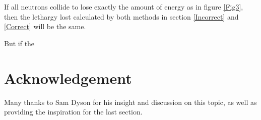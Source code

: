 \documentclass[a4paper, 12pt]{article}
\begin{document}
	If all neutrons collide to lose exactly the amount of energy as in figure \ref{Fig3}, then the lethargy lost calculated by both methods in section \ref{Incorrect} and \ref{Correct} will be the same.

	But if the

\section{Acknowledgement}
	Many thanks to Sam Dyson for his insight and discussion on this topic, as well as providing the inspiration for the last section.
\end{document}
